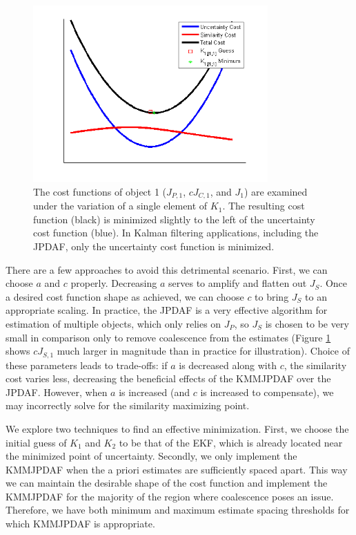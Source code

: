\documentclass[letterpaper, 10pt, conference]{ieeeconf}
\begin{document}
\begin{figure}
\centerline{
\includegraphics[width=9cm]{CostTrends.png}
	}
\caption{The cost functions of object 1 ($J_{P,1}$, $cJ_{C,1}$, and $J_{1}$) are examined under the variation of a single element of $K_1$. The resulting cost function (black) is minimized slightly to the left of the uncertainty cost function (blue). In Kalman filtering applications, including the JPDAF, only the uncertainty cost function is minimized.}
\label{CostTrends}
\end{figure}

There are a few approaches to avoid this detrimental scenario. First, we can choose $a$ and $c$ properly. Decreasing $a$ serves to amplify and flatten out $J_S$. Once a desired cost function shape as achieved, we can choose $c$ to bring $J_S$ to an appropriate scaling. In practice, the JPDAF is a very effective algorithm for estimation of multiple objects, which only relies on $J_P$, so $J_S$ is chosen to be very small in comparison only to remove coalescence from the estimates (Figure \ref{CostTrends} shows $cJ_{S,1}$ much larger in magnitude than in practice for illustration). Choice of these parameters leads to trade-offs: if $a$ is decreased along with $c$, the similarity cost varies less, decreasing the beneficial effects of the KMMJPDAF over the JPDAF. However, when $a$ is increased (and $c$ is increased to compensate), we may incorrectly solve for the similarity maximizing point.

We explore two techniques to find an effective minimization. First, we choose the initial guess of $K_1$ and $K_2$ to be that of the EKF, which is already located near the minimized point of uncertainty. Secondly, we only implement the KMMJPDAF when the a priori estimates are sufficiently spaced apart. This way we can maintain the desirable shape of the cost function and implement the KMMJPDAF for the majority of the region where coalescence poses an issue. Therefore, we have both minimum and maximum estimate spacing thresholds for which KMMJPDAF is appropriate.
\end{document}

